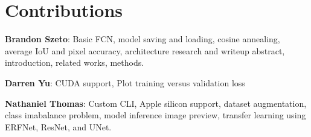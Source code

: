 \section*{Contributions}

\textbf{Brandon Szeto}: Basic FCN, model saving and loading, cosine annealing, average IoU and pixel accuracy, architecture research and writeup abstract, introduction, related works, methods.

\textbf{Darren Yu}: CUDA support, Plot training versus validation loss

\textbf{Nathaniel Thomas}: Custom CLI, Apple silicon support, dataset augmentation, class imabalance problem, model inference image preview, transfer learning using ERFNet, ResNet, and UNet.
